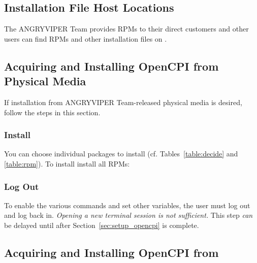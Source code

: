\subsection{Installation File Host Locations}

The ANGRYVIPER Team provides RPMs to their direct customers and other users can find RPMs and other installation files on \yumrepo.

\subsection{Acquiring and Installing OpenCPI from Physical Media}
If installation from ANGRYVIPER Team-released physical media is desired, follow the steps in this section.

\subsubsection{Install}
You can choose individual packages to install (cf. Tables~\ref{table:decide} and \ref{table:rpm}).
To install install all RPMs:\\

\subsubsection{Log Out}
To enable the various  commands and set other variables, the user must log out and log back in. \textit{Opening a new terminal session is not sufficient.} This step \textit{can} be delayed until after Section~\ref{sec:setup_opencpi} is complete.

\pagebreak

\subsection{Acquiring and Installing OpenCPI from }

\begin{center}
\end{center}

